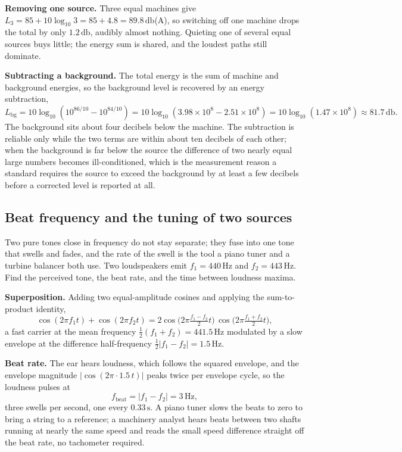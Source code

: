 \textbf{Removing one source.} Three equal machines give
$L_3 = 85 + 10\log_{10}3 = 85 + 4.8 = 89.8\,\si{\decibel}$(A), so
switching off one machine drops the total by only $1.2\,\si{\decibel}$,
audibly almost nothing. Quieting one of several equal sources buys little;
the energy sum is shared, and the loudest paths still dominate.

\textbf{Subtracting a background.} The total energy is the sum of machine
and background energies, so the background level is recovered by an energy
subtraction,
\[
L_{\text{bg}} = 10\log_{10}\!\left(10^{86/10} - 10^{84/10}\right)
             = 10\log_{10}\!\left(3.98\times 10^{8} - 2.51\times 10^{8}\right)
             = 10\log_{10}(1.47\times 10^{8}) \approx 81.7\,\si{\decibel}.
\]
The background sits about four decibels below the machine. The subtraction
is reliable only while the two terms are within about ten decibels of each
other; when the background is far below the source the difference of two
nearly equal large numbers becomes ill-conditioned, which is the
measurement reason a standard requires the source to exceed the background
by at least a few decibels before a corrected level is reported at all.

\subsection{Beat frequency and the tuning of two sources}

Two pure tones close in frequency do not stay separate; they fuse into one
tone that swells and fades, and the rate of the swell is the tool a piano
tuner and a turbine balancer both use. Two loudspeakers emit
$f_1 = 440\,\si{\hertz}$ and $f_2 = 443\,\si{\hertz}$. Find the perceived
tone, the beat rate, and the time between loudness maxima.

\textbf{Superposition.} Adding two equal-amplitude cosines and applying
the sum-to-product identity,
\[
\cos(2\pi f_1 t) + \cos(2\pi f_2 t)
= 2\cos\!\big(2\pi \tfrac{f_1-f_2}{2}t\big)\,
   \cos\!\big(2\pi \tfrac{f_1+f_2}{2}t\big),
\]
a fast carrier at the mean frequency $\tfrac12(f_1+f_2) = 441.5\,\si{
\hertz}$ modulated by a slow envelope at the difference half-frequency
$\tfrac12|f_1-f_2| = 1.5\,\si{\hertz}$.

\textbf{Beat rate.} The ear hears loudness, which follows the squared
envelope, and the envelope magnitude $|\cos(2\pi\cdot 1.5\,t)|$ peaks
twice per envelope cycle, so the loudness pulses at
\[
f_{\text{beat}} = |f_1 - f_2| = 3\,\si{\hertz},
\]
three swells per second, one every $0.33\,\si{\second}$. A piano tuner
slows the beats to zero to bring a string to a reference; a machinery
analyst hears beats between two shafts running at nearly the same speed and
reads the small speed difference straight off the beat rate, no tachometer
required.


